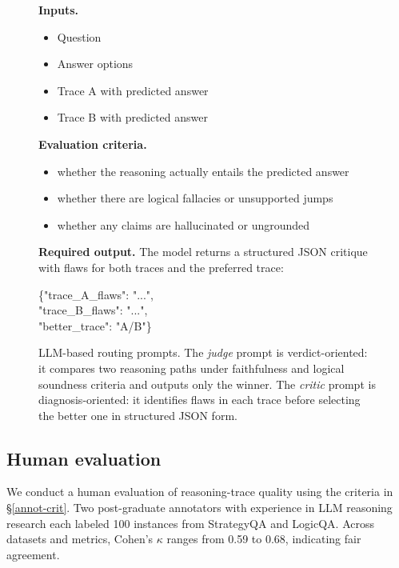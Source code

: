 \documentclass[11pt]{article}
\begin{document}
\begin{figure}[t]
\begin{minipage}[t]{0.485\textwidth}
\begin{tcolorbox}[promptcard,title=LLM-as-Critic]
\vspace{2pt}
\textbf{Inputs.}
\begin{itemize}
    \setlength{\itemsep}{1pt}
    \item Question
    \item Answer options
    \item Trace A with predicted answer
    \item Trace B with predicted answer
\end{itemize}

\vspace{-2pt}
\textbf{Evaluation criteria.}
\begin{itemize}
    \setlength{\itemsep}{1pt}
    \item whether the reasoning actually entails the predicted answer
    \item whether there are logical fallacies or unsupported jumps
    \item whether any claims are hallucinated or ungrounded
\end{itemize}

\vspace{-2pt}
\textbf{Required output.}
The model returns a structured JSON critique with flaws for both traces and the preferred trace:
\begin{center}
\ttfamily
\{"trace\_A\_flaws": "...",\\
"trace\_B\_flaws": "...",\\
"better\_trace": "A/B"\}
\end{center}
\end{tcolorbox}
\end{minipage}

\vspace{2pt}
\caption{LLM-based routing prompts. The \emph{judge} prompt is verdict-oriented: it compares two reasoning paths under faithfulness and logical soundness criteria and outputs only the winner. The \emph{critic} prompt is diagnosis-oriented: it identifies flaws in each trace before selecting the better one in structured JSON form.}
\label{fig:judge_critic_prompts}
\end{figure}




\subsection{Human evaluation}\label{app:human_eval}
We conduct a human evaluation of reasoning-trace quality using the criteria in \S\ref{annot-crit}. Two post-graduate annotators with experience in LLM reasoning research each labeled 100 instances from StrategyQA and LogicQA. Across datasets and metrics, Cohen's \(\kappa\) ranges from 0.59 to 0.68, indicating fair agreement.
\end{document}

